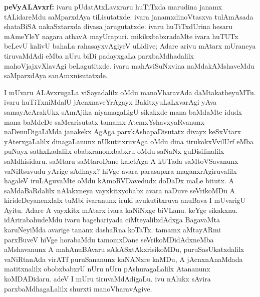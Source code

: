 {\textbf{peVyALAvxrf:}} ivaru pUdatAtxLavxraru huTiTxda marudina janamx tALidareMdu saMparxdAya tiLisutatxde. ivara janamxdinoVtasxva tulAmAsada shataBiSA nakaSxtarxda divasa jarugutatxde. ivaru huTiTxdUrina hesaru mAmeYleY nagara athavA mayUrapuri. mikikxbabxradaMte ivara huTUTx beLevU kalivU bahaLa rahasayxvAgiyeV uLidive; Adare arivu mAtarx mUraneya tiruvaMdAdi eMba nUru biDi padayxgaLa parxbaMdhadalilx mahoVjajxvXlavAgi beLagutitxde. ivaru mahAviSuNxvina naMdakAMshaveMdu saMparxdAya sanAmxnisutatxde.

I mUvaru ALAvxrugaLa viSayadalilx oMdu manoVharavAda daMtakatheyuMTu. ivaru huTiTxniMdalU jAcnxnaveYrAgayx BakitxyuLaLxvarAgi yAva samayAcArakUkx sAmAjika niyamagaLigU sikakxde mana baMdaMte idudx mana baMdeDe saMcarisutatx tamamx AtemxYshavxyaRvanunx naDenuDigaLiMda janakekx AgAga parxkAshapaDisutatx divayx keSxVtarx yAterxgaLalilx dinagaLanunx nUkutitxruvAga oMdu dina tirukokxVvilUrf eMba puNayx sathxLadalilx obabxranonxbabxru oMdu saNaNx guDisilinalilx saMdhisidaru. saMtaru saMtaroDane kaletAga A kUTada saMtoVSavanunx vaNiRsuvudu yArige sAdhayx? hiVge avara parasapxra maganxrAgiruvalilx hagaleV iruLAguvaMte oMdu kAmoRVDavedudx doDaDx maLe bitutx. A saMdaBaRdalilx nAlakxneya vayxkitxyobabx avara naDuve seVrikoMDu A kirideDeyanenxlalx tuMbi ivaranunx iruki avukutitxruva anuBava I mUvarigU Ayitu. Adare A vayxkitx mAtarx ivara kaNiNxge biVLanu. keYge sikakxnu. idArirabahudeMdu ivaru bagehariyada ciMteyalilxdAdxga BagavaMta karuNeyiMda avarige tananx dashaRna koTaTx. tamamx aMtayARmi parxBuveV hiVge horabaMdu tamomxDane seVrikoMDidAdxneMba aMshavanunx A mahAnuBAvaru sAkASxtAkxrisikoMDu, puruSasUkatxdalilx vaNiRtanAda virATf puruSananunx kaNANxre kaMDu, A jAcnxnAnaMdada matitxnalilx obobxbabxrU nUru nUru pAshuragaLalilx Atananunx koMDADidaru. adeV I mUru tiruvaMdAdigaLu. ivu nAlukx sAvira parxbaMdhagaLalilx shurxti manoVharavAgive.

